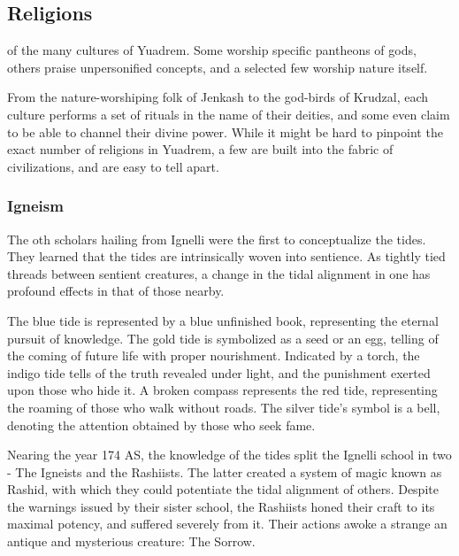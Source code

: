 \subsection*{Religions} \label{ssec::religions}

of the many cultures of Yuadrem.
Some worship specific pantheons of gods, others praise unpersonified concepts, and a selected few worship nature itself.

From the nature-worshiping folk of Jenkash to the god-birds of Krudzal, each culture performs a set of rituals in the name of their deities, and some even claim to be able to channel their divine power.
While it might be hard to pinpoint the exact number of religions in Yuadrem, a few are built into the fabric of civilizations, and are easy to tell apart.

\subsubsection{Igneism}
The oth scholars hailing from Ignelli were the first to conceptualize the tides.
They learned that the tides are intrinsically woven into sentience.
As tightly tied threads between sentient creatures, a change in the tidal alignment in one has profound effects in that of those nearby.

The blue tide is represented by a blue unfinished book, representing the eternal pursuit of knowledge.
The gold tide is symbolized as a seed or an egg, telling of the coming of future life with proper nourishment.
Indicated by a torch, the indigo tide tells of the truth revealed under light, and the punishment exerted upon those who hide it.
A broken compass represents the red tide, representing the roaming of those who walk without roads.
The silver tide's symbol is a bell, denoting the attention obtained by those who seek fame.

Nearing the year 174 AS, the knowledge of the tides split the Ignelli school in two - The Igneists and the Rashiists.
The latter created a system of magic known as Rashid, with which they could potentiate the tidal alignment of others.
Despite the warnings issued by their sister school, the Rashiists honed their craft to its maximal potency, and suffered severely from it.
Their actions awoke a strange an antique and mysterious creature: The Sorrow.

